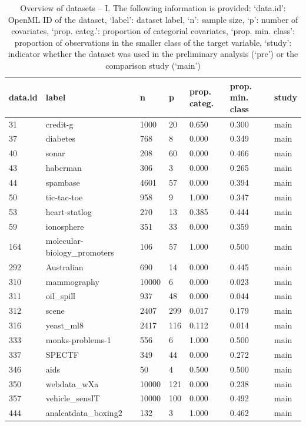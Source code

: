 \begin{table}[!htb]
\caption{Overview of datasets -- I. The following information is provided: `data.id': OpenML ID of the dataset, `label': dataset label, `n': sample size, `p': number of covariates, `prop. categ.': proportion of categorial covariates, `prop. min. class': proportion of observations in the smaller class of the target variable, `study': indicator whether the dataset was used in the preliminary analysis (`pre') or the comparison study (`main')}
\label{tab:data1}
\begin{tabular}{l | l | l | l | l | l | l}
data.id & label & n & p & prop. categ. & prop. min. class & study \\
\hline
31 & credit-g & 1000 & 20 & 0.650 & 0.300 & main \\
37 & diabetes & 768 & 8 & 0.000 & 0.349 & main \\
40 & sonar & 208 & 60 & 0.000 & 0.466 & main \\
43 & haberman & 306 & 3 & 0.000 & 0.265 & main \\
44 & spambase & 4601 & 57 & 0.000 & 0.394 & main \\
50 & tic-tac-toe & 958 & 9 & 1.000 & 0.347 & main \\
53 & heart-statlog & 270 & 13 & 0.385 & 0.444 & main \\
59 & ionosphere & 351 & 33 & 0.000 & 0.359 & main \\
164 & molecular-biology\_promoters & 106 & 57 & 1.000 & 0.500 & main \\
292 & Australian & 690 & 14 & 0.000 & 0.445 & main \\
310 & mammography & 10000 & 6 & 0.000 & 0.023 & main \\
311 & oil\_spill & 937 & 48 & 0.000 & 0.044 & main \\
312 & scene & 2407 & 299 & 0.017 & 0.179 & main \\
316 & yeast\_ml8 & 2417 & 116 & 0.112 & 0.014 & main \\
333 & monks-problems-1 & 556 & 6 & 1.000 & 0.500 & main \\
337 & SPECTF & 349 & 44 & 0.000 & 0.272 & main \\
346 & aids & 50 & 4 & 0.500 & 0.500 & main \\
350 & webdata\_wXa & 10000 & 121 & 0.000 & 0.238 & main \\
357 & vehicle\_sensIT & 10000 & 100 & 0.000 & 0.492 & main \\
444 & analcatdata\_boxing2 & 132 & 3 & 1.000 & 0.462 & main \\

\end{tabular}
\end{table}

